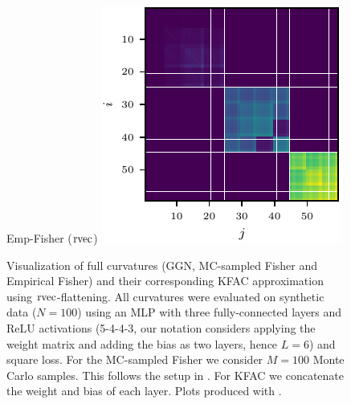 \begin{figure}[t!]
  \hfill
  \begin{minipage}[t]{0.485\linewidth}
    \centering
    Emp-Fisher ($\operatorname{rvec}$)\vspace{1ex}
    \includegraphics[width=0.8\linewidth]{../kfs/plots/synthetic_rvec_empfisher_kfac.pdf}
  \end{minipage}
    \caption{Visualization of full curvatures (GGN, MC-sampled Fisher and Empirical Fisher) and their corresponding KFAC approximation using $\operatorname{rvec}$-flattening. All curvatures were evaluated on synthetic data ($N = 100$) using an MLP with three fully-connected layers and ReLU activations (5-4-4-3, our notation considers applying the weight matrix and adding the bias as two layers, hence $L=6$) and square loss. For the MC-sampled Fisher we consider $M = 100$ Monte Carlo samples. This follows the setup in . For KFAC we concatenate the weight and bias of each layer. 
    Plots produced with .}
    \label{fig:rvec-kfac-full-comparison}
\end{figure}

\switchcolumn[0]


